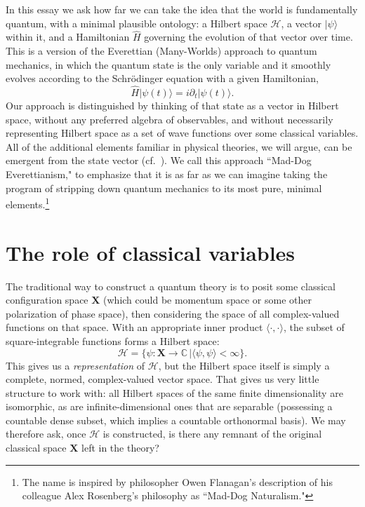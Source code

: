 \documentclass[12pt,english]{article}
\newcommand{\be}{\begin{equation}}
\newcommand{\ee}{\end{equation}}
\newcommand{\HH}{\mathcal{H}}
\begin{document}
In this essay we ask how far we can take the idea that the world is fundamentally quantum, with a minimal plausible ontology: a Hilbert space $\HH$, a vector $|\psi\rangle$ within it, and a Hamiltonian $\hat H$ governing the evolution of that vector over time.
This is a version of the Everettian (Many-Worlds) approach to quantum mechanics, in which the quantum state is the only variable and it smoothly evolves according to the Schr\"odinger equation with a given Hamiltonian,
\be
  \hat H |\psi(t)\rangle = i \partial_t|\psi(t)\rangle.
\ee
Our approach is distinguished by thinking of that state as a vector in Hilbert space, without any preferred algebra of observables, and without necessarily representing Hilbert space as a set of wave functions over some classical variables.
All of the additional elements familiar in physical theories, we will argue, can be emergent from the state vector (cf.\ \cite{Giddings:2015lla}).
We call this approach ``Mad-Dog Everettianism," to emphasize that it is as far as we can imagine taking the program of stripping down quantum mechanics to its most pure, minimal elements.\footnote{The name is inspired by philosopher Owen Flanagan's description of his colleague Alex Rosenberg's philosophy as ``Mad-Dog Naturalism."}

\section{The role of classical variables}

The traditional way to construct a quantum theory is to posit some classical configuration space $\mathbf{X}$ (which could be momentum space or some other polarization of phase space), then considering the space of all complex-valued functions on that space.
With an appropriate inner product $\langle \cdot,\cdot\rangle$, the subset of square-integrable functions forms a Hilbert space:
\be
 \HH = \{\psi : \mathbf{X} \rightarrow \mathbb{C}\, {\big|} \langle\psi, \psi\rangle < \infty\}.
\ee
This gives us a \emph{representation} of $\HH$, but the Hilbert space itself is simply a complete, normed, complex-valued vector space. 
That gives us very little structure to work with: all Hilbert spaces of the same finite dimensionality are isomorphic, as are infinite-dimensional ones that are separable (possessing a countable dense subset, which implies a countable orthonormal basis).
We may therefore ask, once $\HH$ is constructed, is there any remnant of the original classical space $\mathbf{X}$ left in the theory?
\end{document}
